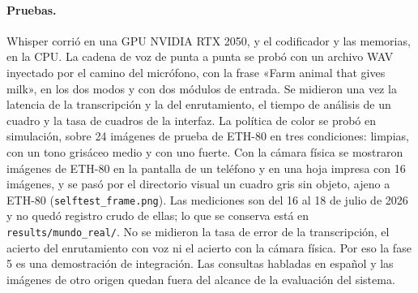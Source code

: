\paragraph{Pruebas.}
Whisper corrió en una GPU NVIDIA RTX 2050, y el codificador y las memorias, en la CPU.
La cadena de voz de punta a punta se probó con un archivo WAV inyectado por el camino
del micrófono, con la frase «Farm animal that gives milk», en los dos modos y con dos
módulos de entrada.
Se midieron una vez la latencia de la transcripción y la del enrutamiento, el tiempo de
análisis de un cuadro y la tasa de cuadros de la interfaz.
La política de color se probó en simulación, sobre 24 imágenes de prueba de ETH-80 en
tres condiciones: limpias, con un tono grisáceo medio y con uno fuerte.
Con la cámara física se mostraron imágenes de ETH-80 en la pantalla de un teléfono y en
una hoja impresa con 16 imágenes, y se pasó por el directorio visual un cuadro gris sin
objeto, ajeno a ETH-80 (\texttt{selftest\_frame.png}).
Las mediciones son del 16 al 18 de julio de 2026 y no quedó registro crudo de ellas;
lo que se conserva está en \texttt{results/mundo\_real/}.
No se midieron la tasa de error de la transcripción, el acierto del enrutamiento con voz
ni el acierto con la cámara física.
Por eso la fase 5 es una demostración de integración.
Las consultas habladas en español y las imágenes de otro origen quedan fuera del alcance
de la evaluación del sistema.
